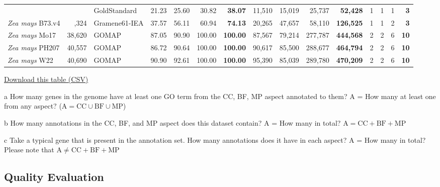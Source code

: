 \documentclass[utf8]{frontiersSCNS}
\begin{document}
\begin{table}[t]
{\begin{threeparttable}
\begin{tabular}{lrlrrr>{\bfseries}r|rrr>{\bfseries}r|rrr>{\bfseries}r}
\rowcolor{gray!6}   &  & GoldStandard & 21.23 & 25.60 & 30.82 & 38.07 & 11,510 & 15,019 & 25,737 & 52,428 & 1 & 1 & 1 & 3\\

\multirow{-3}{*}{\raggedright\arraybackslash \textit{Zea mays} B73.v4} & \multirow{-3}{*}{\raggedleft\arraybackslash 39,324} & Gramene61-IEA & 37.57 & 56.11 & 60.94 & 74.13 & 20,265 & 47,657 & 58,110 & 126,525 & 1 & 1 & 2 & 3\\
\cmidrule{1-15}
\rowcolor{gray!6}  \textit{Zea mays} Mo17 & 38,620 & GOMAP & 87.05 & 90.90 & 100.00 & 100.00 & 87,567 & 79,214 & 277,787 & 444,568 & 2 & 2 & 6 & 10\\
\cmidrule{1-15}
\textit{Zea mays} PH207 & 40,557 & GOMAP & 86.72 & 90.64 & 100.00 & 100.00 & 90,617 & 85,500 & 288,677 & 464,794 & 2 & 2 & 6 & 10\\
\cmidrule{1-15}
\rowcolor{gray!6}  \textit{Zea mays} W22 & 40,690 & GOMAP & 90.90 & 92.61 & 100.00 & 100.00 & 95,390 & 85,039 & 289,780 & 470,209 & 2 & 2 & 6 & 10\\
\bottomrule
\end{tabular}
\begin{tablenotes}
\item \href{https://raw.githubusercontent.com/Dill-PICL/GOMAP-Paper-2019.1/master/analyses/quantity/results/quantity_table.csv}{Download this table (CSV)}
\item[a] How many genes in the genome have at least one GO term from the CC, BF, MP aspect annotated to them? A = How many at least one from any aspect? ($\textrm{A} = \textrm{CC} \cup \textrm{BF} \cup \textrm{MP}$)
\item[b] How many annotations in the CC, BF, and MP aspect does this dataset contain? A = How many in total? $\textrm{A} = \textrm{CC} + \textrm{BF} + \textrm{MP}$
\item[c] Take a typical gene that is present in the annotation set. How many annotations does it have in each aspect? A = How many in total? Please note that $\textrm{A} \neq \textrm{CC} + \textrm{BF} +\textrm{MP}$
\end{tablenotes}
\end{threeparttable}}
\end{table}

\hypertarget{quality-evaluation-1}{%
\subsection{Quality Evaluation}\label{quality-evaluation-1}}
\end{document}
